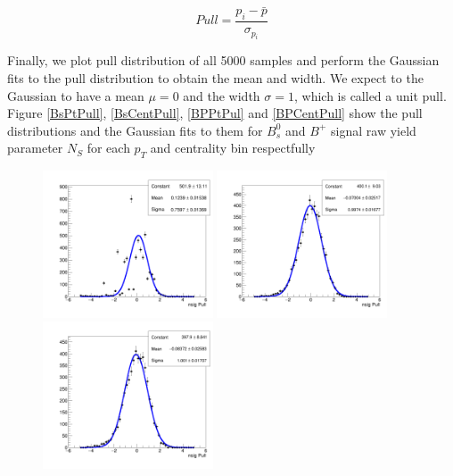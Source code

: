 \begin{equation}
Pull = \frac{p_i - \bar p}{\sigma_{p_i}}
\end{equation}

Finally, we plot pull distribution of all 5000 samples and perform the Gaussian fits to the pull distribution to obtain the mean and width. We expect to the Gaussian to have a mean $\mu = 0$ and the width $\sigma = 1$, which is called a unit pull. Figure \ref{BsPtPull}, \ref{BsCentPull}, \ref{BPPtPul} and \ref{BPCentPull} show the pull distributions and the Gaussian fits to them for $B^0_s$ and $B^+$ signal raw yield parameter $N_S$ for each $p_T$ and centrality bin respectfully 



\begin{figure}[h]
\begin{center}
\includegraphics[width= 0.45\textwidth]{Figures/Chapter4/pull_signal_BptNew_0_90_7_10_0_Bs.png}
\includegraphics[width= 0.45\textwidth]{Figures/Chapter4/pull_signal_BptNew_0_90_10_15_0_Bs.png}
\includegraphics[width= 0.45\textwidth]{Figures/Chapter4/pull_signal_BptNew_0_90_15_20_0_Bs.png}

\end{center}
\end{figure}
